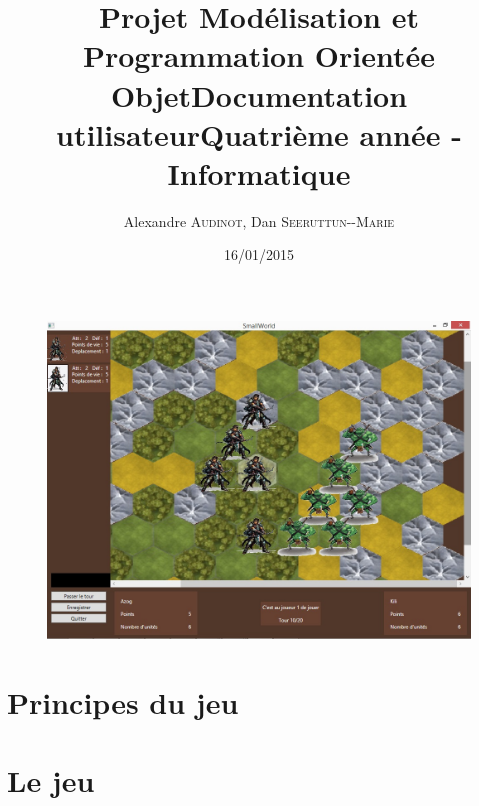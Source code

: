 \documentclass[12pt]{article}
\title{Projet Modélisation et Programmation Orientée Objet\smallbreak Documentation utilisateur\smallbreak Quatrième année - Informatique }
\author{Alexandre \textsc{Audinot},  Dan \textsc{Seeruttun-{}-Marie}}
\date{16/01/2015}
\begin{document}
\maketitle

\begin{figure}[!h] 
\centerline{\includegraphics[scale=0.65]{img/cover.jpg}}
\end{figure}
\newpage

\newpage
\tableofcontents
\newpage

\section{Principes du jeu}

\newpage
\section{Le jeu}

\end{document}

